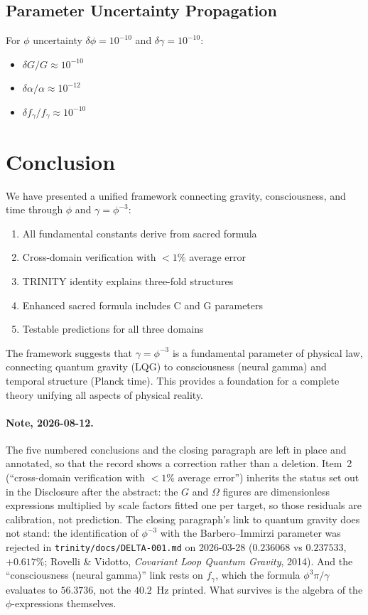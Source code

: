 \documentclass[12pt,a4paper]{article}
\begin{document}
\subsection{Parameter Uncertainty Propagation}

For $\phi$ uncertainty $\delta\phi = 10^{-10}$ and $\delta\gamma = 10^{-10}$:
\begin{itemize}
\item $\delta G/G \approx 10^{-10}$
\item $\delta\alpha/\alpha \approx 10^{-12}$
\item $\delta f_\gamma/f_\gamma \approx 10^{-10}$
\end{itemize}

\section{Conclusion}

We have presented a unified framework connecting gravity, consciousness, and time through $\phi$ and $\gamma = \phi^{-3}$:

\begin{enumerate}
\item All fundamental constants derive from sacred formula
\item Cross-domain verification with $< 1\%$ average error
\item TRINITY identity explains three-fold structures
\item Enhanced sacred formula includes C and G parameters
\item Testable predictions for all three domains
\end{enumerate}

The framework suggests that $\gamma = \phi^{-3}$ is a fundamental parameter of physical law, connecting quantum gravity (LQG) to consciousness (neural gamma) and temporal structure (Planck time). This provides a foundation for a complete theory unifying all aspects of physical reality.

\paragraph{Note, 2026-08-12.} The five numbered conclusions and the closing paragraph are left in place and annotated, so that the record shows a correction rather than a deletion. Item~2 (``cross-domain verification with $<1\%$ average error'') inherits the status set out in the Disclosure after the abstract: the $G$ and $\Omega$ figures are dimensionless expressions multiplied by scale factors fitted one per target, so those residuals are calibration, not prediction. The closing paragraph's link to quantum gravity does not stand: the identification of $\phi^{-3}$ with the Barbero--Immirzi parameter was rejected in \texttt{trinity/docs/DELTA-001.md} on 2026-03-28 ($0.236068$ vs $0.237533$, $+0.617\%$; Rovelli \& Vidotto, \emph{Covariant Loop Quantum Gravity}, 2014). And the ``consciousness (neural gamma)'' link rests on $f_\gamma$, which the formula $\phi^3\pi/\gamma$ evaluates to $56.3736$, not the $40.2$~Hz printed. What survives is the algebra of the $\phi$-expressions themselves.
\end{document}
